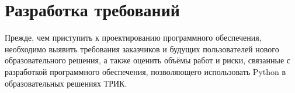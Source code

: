 \documentclass[14pt]{matmex-diploma-custom}
\begin{document}
\begin{table}[]
\centering
{}
\caption{Сравнение фреймворков}
\label{table:frameworkComparison}
\end{table}

\section{Разработка требований}
Прежде, чем приступить к проектированию программного обеспечения, необходимо выявить требования заказчиков и будущих пользователей нового образовательного решения, а также оценить объёмы работ и риски, связанные с разработкой программного обеспечения, позволяющего использовать Python в образовательных решениях ТРИК. 
\end{document}
